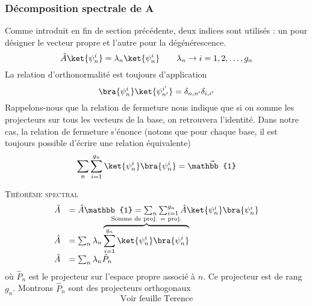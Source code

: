 \subsubsection{Décomposition spectrale de A}
Comme introduit en fin de section précédente, deux indices sont utilisés : 
un pour désigner le vecteur propre et l'autre pour la dégénérescence.
\begin{equation}
\hat{A}\ket{\psi_n^i} = \lambda_n\ket{\psi_n^i}\qquad \lambda_n \rightarrow i=
1,2,\dots, g_n
\end{equation}
La relation d'orthonormalité est toujours d'application
\begin{equation}
\bra{\psi_n^i}\ket{\psi_{n'}^{i'}} = \delta_{n,n'}\delta_{i,i'}
\end{equation}
Rappelons-nous que la relation de fermeture nous indique que si on somme les 
projecteurs sur tous les vecteurs de la base, on retrouvera l'identité. Dans 
notre cas, la relation de fermeture s'énonce (notons que pour chaque base, il 
est toujours possible d'écrire une relation équivalente) 
\begin{equation}
\sum_n\sum_{i=1}^{g_n} \ket{\psi_n^i}\bra{\psi_n^i} = \vec{\mathbb{1}}
\end{equation}

\textsc{Théorème spectral}\\
\begin{equation}
\begin{array}{ll}
\hat{A} &= \hat{A}\mathbb{1} = \sum_n\sum_{i=1}^{g_n} \hat{A}\ket{\psi_n^i
}\bra{\psi_n^i}\\
\hat{A} &= \sum_n \lambda_n \overbrace{\sum_{i=1}^{g_n} \ket{\psi_n^i}\bra{
\psi_n^i}}^{\text{Somme de proj. = proj.}}\\
\hat{A} &= \sum_n \lambda_n \hat{P}_n
\end{array}
\end{equation}
où $\hat{P}_n$ est le projecteur sur l'espace propre associé à $n$. Ce 
projecteur est de rang $g_n$. Montrons $\hat{P}_n$ sont des projecteurs 
orthogonaux
\begin{equation}
\text{Voir feuille Terence}
\end{equation}




